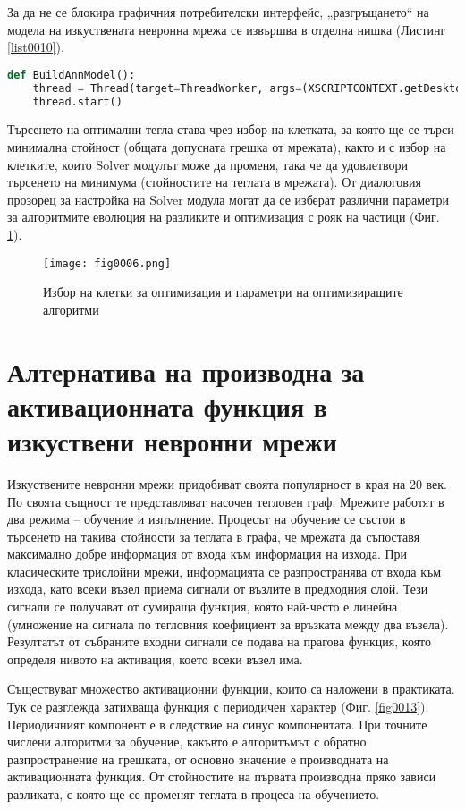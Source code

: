 За да не се блокира графичния потребителски интерфейс, „разгръщането“ на модела на изкуствената невронна мрежа се извършва в отделна нишка (Листинг \ref{list0010}).

\begin{lstlisting}[caption=Изпълнение с отделна нишка, language=Python, basicstyle=\tiny, label=list0010]
def BuildAnnModel():
    thread = Thread(target=ThreadWorker, args=(XSCRIPTCONTEXT.getDesktop(),))
    thread.start()
\end{lstlisting}

Търсенето на оптимални тегла става чрез избор на клетката, за която ще се търси минимална стойност (общата допусната грешка от мрежата), както и с избор на клетките, които Solver модулът може да променя, така че да удовлетвори търсенето на минимума (стойностите на теглата в мрежата). От диалоговия прозорец за настройка на Solver модула могат да се изберат различни параметри за алгоритмите еволюция на разликите и оптимизация с рояк на частици (Фиг. \ref{fig0006}).

\begin{figure}[H]
  \centering
  \texttt{[image: fig0006.png]}
  \caption{Избор на клетки за оптимизация и параметри на оптимизиращите алгоритми}
\label{fig0006}
\end{figure}

\section{Алтернатива на производна за активационната функция в изкуствени невронни мрежи}

Изкуствените невронни мрежи придобиват своята популярност в края на 20 век. По своята същност те представляват насочен тегловен граф. Мрежите работят в два режима – обучение и изпълнение. Процесът на обучение се състои в търсенето на такива стойности за теглата в графа, че мрежата да съпоставя максимално добре информация от входа към информация на изхода. При класическите трислойни мрежи, информацията се разпространява от входа към изхода, като всеки възел приема сигнали от възлите в предходния слой. Тези сигнали се получават от сумираща функция, която най-често е линейна (умножение на сигнала по тегловния коефициент за връзката между два възела). Резултатът от събраните входни сигнали се подава на прагова функция, която определя нивото на активация, което всеки възел има.

Съществуват множество активационни функции, които са наложени в практиката. Тук се разглежда затихваща функция с периодичен характер (Фиг. \ref{fig0013}). Периодичният компонент е в следствие на синус компонентата. При точните числени алгоритми за обучение, какъвто е алгоритъмът с обратно разпространение на грешката, от основно значение е производната на активационната функция. От стойностите на първата производна пряко зависи разликата, с която ще се променят теглата в процеса на обучението.

